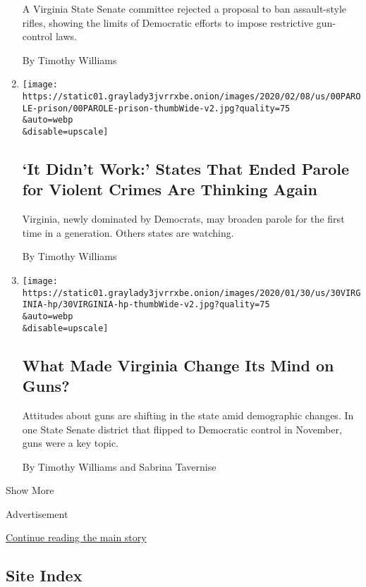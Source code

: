 \begin{enumerate}
  A Virginia State Senate committee rejected a proposal to ban
  assault-style rifles, showing the limits of Democratic efforts to
  impose restrictive gun-control laws.

  By Timothy Williams
\item
  \href{/2020/02/13/us/parole-virginia.html}{}

  \texttt{[image: https://static01.graylady3jvrrxbe.onion/images/2020/02/08/us/00PAROLE-prison/00PAROLE-prison-thumbWide-v2.jpg?quality=75\\\&auto=webp\\\&disable=upscale]}

  \hypertarget{it-didnt-work-states-that-ended-parole-for-violent-crimes-are-thinking-again}{%
  \subsection{`It Didn't Work:' States That Ended Parole for Violent
  Crimes Are Thinking
  Again}\label{it-didnt-work-states-that-ended-parole-for-violent-crimes-are-thinking-again}}

  Virginia, newly dominated by Democrats, may broaden parole for the
  first time in a generation. Others states are watching.

  By Timothy Williams
\item
  \href{/2020/01/30/us/virginia-gun-limits.html}{}

  \texttt{[image: https://static01.graylady3jvrrxbe.onion/images/2020/01/30/us/30VIRGINIA-hp/30VIRGINIA-hp-thumbWide-v2.jpg?quality=75\\\&auto=webp\\\&disable=upscale]}

  \hypertarget{what-made-virginia-change-its-mind-on-guns}{%
  \subsection{What Made Virginia Change Its Mind on
  Guns?}\label{what-made-virginia-change-its-mind-on-guns}}

  Attitudes about guns are shifting in the state amid demographic
  changes. In one State Senate district that flipped to Democratic
  control in November, guns were a key topic.

  By Timothy Williams and Sabrina Tavernise
\end{enumerate}

Show More

Advertisement

\protect\hyperlink{after-mid2}{Continue reading the main story}

\hypertarget{site-index}{%
\subsection{Site Index}\label{site-index}}

